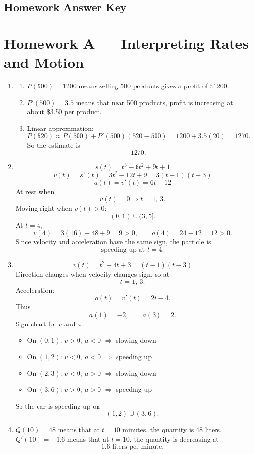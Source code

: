 \documentclass[11pt]{article}
\newcommand{\unitchapter}[1]{\newpage\subsection{#1}}
\begin{document}

\unitchapter{Homework Answer Key}

\section*{Homework A --- Interpreting Rates and Motion}

\begin{enumerate}
    \item 
    \begin{enumerate}
        \item \(P(500)=1200\) means selling 500 products gives a profit of \$1200.
        \item \(P'(500)=3.5\) means that near 500 products, profit is increasing at about \$3.50 per product.
        \item Linear approximation:
        \[
        P(520)\approx P(500)+P'(500)(520-500)=1200+3.5(20)=1270.
        \]
        So the estimate is
        \[
        \boxed{1270}.
        \]
    \end{enumerate}

    \item 
    \[
    s(t)=t^3-6t^2+9t+1
    \]
    \[
    v(t)=s'(t)=3t^2-12t+9=3(t-1)(t-3)
    \]
    \[
    a(t)=v'(t)=6t-12
    \]
    At rest when
    \[
    v(t)=0 \Rightarrow t=1,\ 3.
    \]
    Moving right when \(v(t)>0\):
    \[
    (0,1)\cup(3,5].
    \]
    At \(t=4\),
    \[
    v(4)=3(16)-48+9=9>0,\qquad a(4)=24-12=12>0.
    \]
    Since velocity and acceleration have the same sign, the particle is
    \[
    \boxed{\text{speeding up at } t=4.}
    \]

    \item 
    \[
    v(t)=t^2-4t+3=(t-1)(t-3)
    \]
    Direction changes when velocity changes sign, so at
    \[
    t=1,\ 3.
    \]
    Acceleration:
    \[
    a(t)=v'(t)=2t-4.
    \]
    Thus
    \[
    a(1)=-2,\qquad a(3)=2.
    \]
    Sign chart for \(v\) and \(a\):
    \begin{itemize}
        \item On \((0,1)\): \(v>0,\ a<0\) \(\Rightarrow\) slowing down
        \item On \((1,2)\): \(v<0,\ a<0\) \(\Rightarrow\) speeding up
        \item On \((2,3)\): \(v<0,\ a>0\) \(\Rightarrow\) slowing down
        \item On \((3,6)\): \(v>0,\ a>0\) \(\Rightarrow\) speeding up
    \end{itemize}
    So the car is speeding up on
    \[
    \boxed{(1,2)\cup(3,6).}
    \]

    \item 
    \(Q(10)=48\) means that at \(t=10\) minutes, the quantity is 48 liters.  
    \(Q'(10)=-1.6\) means that at \(t=10\), the quantity is decreasing at
    \[
    \boxed{1.6\text{ liters per minute}.}
    \]
\end{enumerate}
\end{document}
